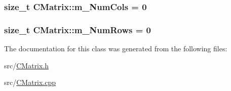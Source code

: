 \subsubsection[{\texorpdfstring{m\+\_\+\+Num\+Cols}{m_NumCols}}]{\setlength{\rightskip}{0pt plus 5cm}size\+\_\+t C\+Matrix\+::m\+\_\+\+Num\+Cols = 0\hspace{0.3cm}{\ttfamily [protected]}}\hypertarget{classCMatrix_a672c792e0f63bd7d5149f737e21d6abc}{}\label{classCMatrix_a672c792e0f63bd7d5149f737e21d6abc}
\subsubsection[{\texorpdfstring{m\+\_\+\+Num\+Rows}{m_NumRows}}]{\setlength{\rightskip}{0pt plus 5cm}size\+\_\+t C\+Matrix\+::m\+\_\+\+Num\+Rows = 0\hspace{0.3cm}{\ttfamily [protected]}}\hypertarget{classCMatrix_affdcac23fd59da78e6e3902a32f48da3}{}\label{classCMatrix_affdcac23fd59da78e6e3902a32f48da3}


The documentation for this class was generated from the following files\+:\begin{DoxyCompactItemize}
\item 
src/\hyperlink{CMatrix_8h}{C\+Matrix.\+h}\item 
src/\hyperlink{CMatrix_8cpp}{C\+Matrix.\+cpp}\end{DoxyCompactItemize}
